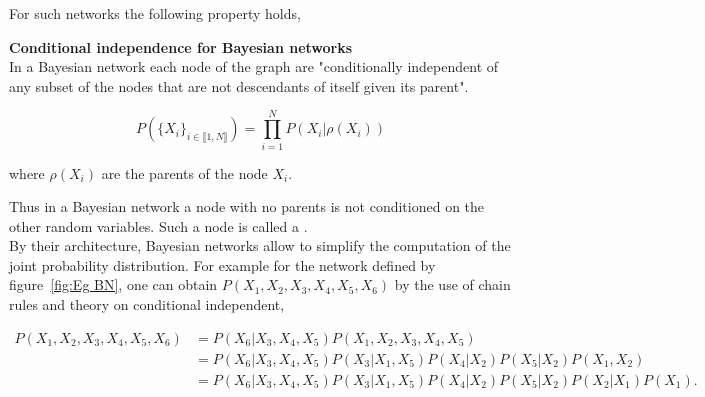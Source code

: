 \documentclass[a4paper,11pt]{report}
\begin{document}
			For such networks the following property holds,
			
			\begin{prop} \textbf{Conditional independence for Bayesian networks}\\ %
				In a Bayesian network each node of the graph are "conditionally independent of any subset of the nodes that are not descendants of itself given its parent".
				
				\begin{equation}
				  P(\{X_{i}\}_{i \in \llbracket1,N \rrbracket}) = \prod_{i=1}^{N} P(X_{i} | \rho(X_{i}))
				  \label{eq:BN CI}
				\end{equation}
				
				where $\rho(X_{i})$ are the parents of the node $X_{i}$. 
				\label{pty:CI for BNs}
			\end{prop}
			
			Thus in a Bayesian network a node with no parents is not conditioned on the other random variables. Such a node is called a .\\

			By their architecture, Bayesian networks allow to simplify the computation of the joint probability distribution. For example for the network defined by figure~\ref{fig:Eg BN}, one can obtain $P(X_{1},X_{2},X_{3},X_{4},X_{5},X_{6})$ by the use of chain rules and theory on conditional independent,
			
			\begin{equation*}
			  \begin{split}
			    P(X_{1},X_{2},X_{3},X_{4},X_{5},X_{6})
						&= P(X_{6} | X_{3},X_{4},X_{5}) P(X_{1},X_{2},X_{3},X_{4},X_{5}) \\
						&= P(X_{6} | X_{3},X_{4},X_{5}) P(X_{3} | X_{1},X_{5}) P(X_{4}| X_{2}) P(X_{5}| X_{2}) P(X_{1},X_{2})\\
						&= P(X_{6} | X_{3},X_{4},X_{5}) P(X_{3} | X_{1},X_{5}) P(X_{4}| X_{2}) P(X_{5}| X_{2}) P(X_{2}|X_{1}) P(X_{1}).\\
			  \end{split}
			  \label{eq:Eg BN CI}
			\end{equation*}
      
\end{document}
